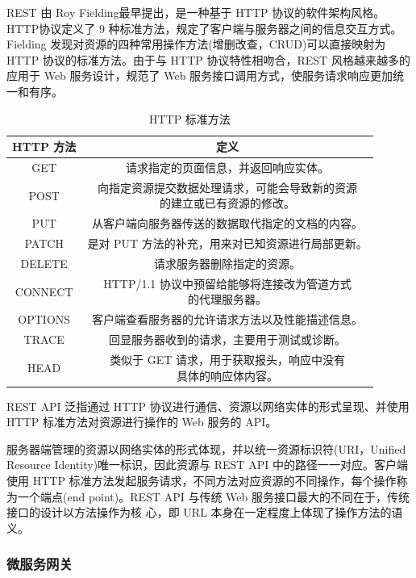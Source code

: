 REST 由 Roy Fielding最早提出，是一种基于 HTTP 协议的软件架构风格。HTTP协议定义了 9 种标准方法，规定了客户端与服务器之间的信息交互方式。Fielding 发现对资源的四种常用操作方法(增删改查，CRUD)可以直接映射为 HTTP 协议的标准方法。由于与 HTTP 协议特性相吻合，REST 风格越来越多的应用于 Web 服务设计，规范了 Web 服务接口调用方式，使服务请求响应更加统一和有序。\par
\begin{table}[H]
    \centering
    \caption{HTTP 标准方法}
    \begin{tabular}{|c|c|}
        \hline
        HTTP 方法 & 定义 \\\hline
        GET & 请求指定的页面信息，并返回响应实体。 \\\hline
        POST & \makecell[c]{向指定资源提交数据处理请求，可能会导致新的资源\\的建立或已有资源的修改。} \\\hline
        PUT & 从客户端向服务器传送的数据取代指定的文档的内容。 \\\hline
        PATCH & 是对 PUT 方法的补充，用来对已知资源进行局部更新。 \\\hline
        DELETE & 请求服务器删除指定的资源。 \\\hline
        CONNECT & \makecell[c]{HTTP/1.1 协议中预留给能够将连接改为管道方式\\的代理服务器。} \\\hline
        OPTIONS & 客户端查看服务器的允许请求方法以及性能描述信息。 \\\hline
        TRACE & 回显服务器收到的请求，主要用于测试或诊断。 \\\hline
        HEAD & \makecell[c]{类似于 GET 请求，用于获取报头，响应中没有\\具体的响应体内容。} \\\hline
    \end{tabular}
\end{table}
REST API 泛指通过 HTTP 协议进行通信、资源以网络实体的形式呈现、并使用HTTP 标准方法对资源进行操作的 Web 服务的 API。 \par
服务器端管理的资源以网络实体的形式体现，并以统一资源标识符(URI，Unified Resource Identity)唯一标识，因此资源与 REST API 中的路径一一对应。客户端使用 HTTP 标准方法发起服务请求，不同方法对应资源的不同操作，每个操作称为一个端点(end point)。REST API 与传统 Web 服务接口最大的不同在于，传统接口的设计以方法操作为核
心，即 URL 本身在一定程度上体现了操作方法的语义。

\subsubsection{微服务网关}


